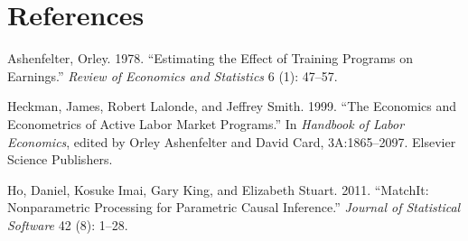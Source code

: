 \documentclass[]{article}
\begin{document}
\newpage

\section{References}\label{references}

Ashenfelter, Orley. 1978. ``Estimating the Effect of Training Programs
on Earnings.'' \emph{Review of Economics and Statistics} 6 (1): 47--57.

Heckman, James, Robert Lalonde, and Jeffrey Smith. 1999. ``The Economics
and Econometrics of Active Labor Market Programs.'' In \emph{Handbook of
Labor Economics}, edited by Orley Ashenfelter and David Card,
3A:1865--2097. Elsevier Science Publishers.

Ho, Daniel, Kosuke Imai, Gary King, and Elizabeth Stuart. 2011.
``MatchIt: Nonparametric Processing for Parametric Causal Inference.''
\emph{Journal of Statistical Software} 42 (8): 1--28.
\end{document}
